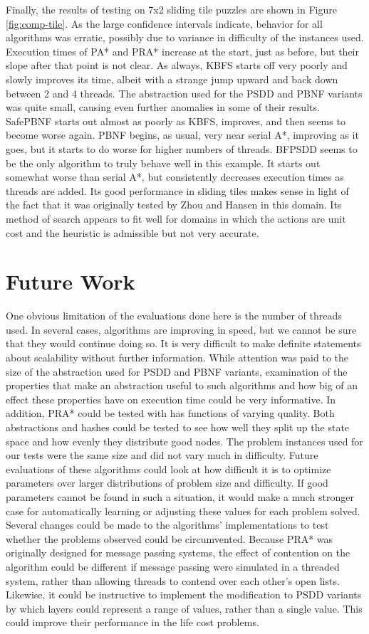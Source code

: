 \documentclass{article}
\begin{document}
Finally, the results of testing on 7x2 sliding tile puzzles are shown in Figure \ref{fig:comp-tile}. As the large confidence intervals indicate, behavior for all algorithms was erratic, possibly due to variance in difficulty of the instances used. Execution times of PA* and PRA* increase at the start, just as before, but their slope after that point is not clear. As always, KBFS starts off very poorly and slowly improves its time, albeit with a strange jump upward and back down between 2 and 4 threads. The abstraction used for the PSDD and PBNF variants was quite small, causing even further anomalies in some of their results. SafePBNF starts out almost as poorly as KBFS, improves, and then seems to become worse again. PBNF begins, as usual, very near serial A*, improving as it goes, but it starts to do worse for higher numbers of threads. BFPSDD seems to be the only algorithm to truly behave well in this example. It starts out somewhat worse than serial A*, but consistently decreases execution times as threads are added. Its good performance in sliding tiles makes sense in light of the fact that it was originally tested by Zhou and Hansen in this domain. Its method of search appears to fit well for domains in which the actions are unit cost and the heuristic is admissible but not very accurate.
\section{Future Work}
One obvious limitation of the evaluations done here is the number of threads used. In several cases, algorithms are improving in speed, but we cannot be sure that they would continue doing so. It is very difficult to make definite statements about scalability without further information.
While attention was paid to the size of the abstraction used for PSDD and PBNF variants, examination of the properties that make an abstraction useful to such algorithms and how big of an effect these properties have on execution time could be very informative. In addition, PRA* could be tested with has functions of varying quality. Both abstractions and hashes could be tested to see how well they split up the state space and how evenly they distribute good nodes.
The problem instances used for our tests were the same size and did not vary much in difficulty. Future evaluations of these algorithms could look at how difficult it is to optimize parameters over larger distributions of problem size and difficulty. If good parameters cannot be found in such a situation, it would make a much stronger case for automatically learning or adjusting these values for each problem solved.
Several changes could be made to the algorithms' implementations to test whether the problems observed could be circumvented. Because PRA* was originally designed for message passing systems, the effect of contention on the algorithm could be different if message passing were simulated in a threaded system, rather than allowing threads to contend over each other's open lists. Likewise, it could be instructive to implement the modification to PSDD variants by which layers could represent a range of values, rather than a single value. This could improve their performance in the life cost problems.
\end{document}
